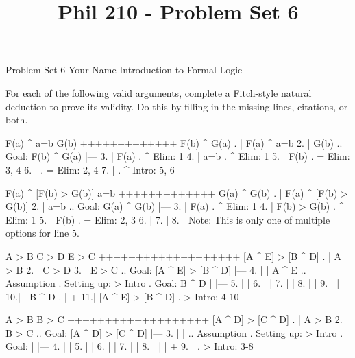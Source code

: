 
\title{Phil 210 - Problem Set 6}

\heading
Problem Set 6
Your Name
Introduction to Formal Logic
\endheading

For each of the following valid arguments, complete a Fitch-style natural deduction to prove its validity. Do this by filling in the missing lines, citations, or both.

\problems
{}
\argument
 F(a) ^ a=b
 G(b)
+++++++++++++
 F(b) ^ G(a)
\endargument
        \answer
        . | F(a) ^ a=b
         2. | G(b)         ..  Goal: F(b) ^ G(a)
            |---
         3. | F(a)         .  ^ Elim: 1
         4. | a=b          .  ^ Elim: 1
         5. | F(b)         .  = Elim: 3, 4
         6. |              .  = Elim: 2, 4
         7. |              .  ^ Intro: 5, 6
        \endfitchproof
        \endanswer

\argument
 F(a) ^ [F(b) > G(b)]
 a=b
+++++++++++++
 G(a) ^ G(b)
\endargument
        \answer
        . | F(a) ^ [F(b) > G(b)]
         2. | a=b          ..  Goal: G(a) ^ G(b)
            |---
         3. | F(a)         .  ^ Elim: 1
         4. | F(b) > G(b)  .  ^ Elim: 1
         5. | F(b)         .  = Elim: 2, 3
         6. | 
         7. | 
         8. | 
        \endfitchproof
        \endanswer
Note: This is only one of multiple options for line 5.

\argument
 A > B
 C > D
 E > C
+++++++++++++++++++
 [A ^ E] > [B ^ D]
\endargument
        \answer
        . | A > B
         2. | C > D
         3. | E > C      ..  Goal: [A ^ E] > [B ^ D]
            |---
         4. |   | A ^ E  ..  Assumption  .  Setting up: > Intro  .  Goal: B ^ D
            |   |---
         5. |   | 
         6. |   | 
         7. |   | 
         8. |   | 
         9. |   | 
         10.|   | B ^ D   .  
            |   +
         11.| [A ^ E] > [B ^ D]  .  > Intro: 4-10
        \endfitchproof
        \endanswer

\argument
 A > B
 B > C
+++++++++++++++++++
 [A ^ D] > [C ^ D]
\endargument
        \answer
        . | A > B
         2. | B > C      ..  Goal: [A ^ D] > [C ^ D]
            |---
         3. |   |        ..  Assumption  .  Setting up: > Intro  .  Goal: 
            |   |---
         4. |   | 
         5. |   | 
         6. |   | 
         7. |   | 
         8. |   | 
            |   +
         9. |            .  > Intro: 3-8
        \endfitchproof
        \endanswer

